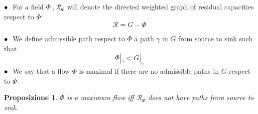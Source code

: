 \documentclass{article}
\theoremstyle{plain}
\newtheorem{prop}[teo]{Proposizione}
\theoremstyle{definition}
\theoremstyle{remark}
\begin{document}
                                                                                                                                                                                                                                                                                                                                                                                                                                                                                                                                                                                                                                                                                                                                                                                                                                                                                                                                                                                                                                                   

 $\small\bullet\ $ For a field $\Phi\ , \mathcal{R}_{\Phi}$ will denote the directed weighted graph of residual capacities respect to $\Phi$:
\begin{equation}
\label{eq:residual-capacity}
\mathcal{R} =
    G-\Phi
\end{equation}

$\small\bullet\ $  We define admissible path respect to $\Phi$  a path $\gamma$ in $G$ from source to sink such that 
\begin{equation*}
\Phi|_{\gamma} < G|_{\gamma}
\end{equation*}
$\small\bullet\ $ We say that a flow $\Phi$ is maximal if there are no admissible paths in $G$ respect to $\Phi$.

\begin{prop}
$\Phi$ is a maximum flow iff $\mathcal{R}_{\Phi}$ does not have paths from source to sink.\\ \\ \\ \\
\end{prop}
\end{document}
